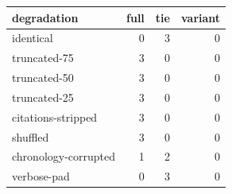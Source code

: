 \begin{tabular}{lrrr}
\toprule
degradation & full & tie & variant \\
\midrule
identical & 0 & 3 & 0 \\
truncated-75 & 3 & 0 & 0 \\
truncated-50 & 3 & 0 & 0 \\
truncated-25 & 3 & 0 & 0 \\
citations-stripped & 3 & 0 & 0 \\
shuffled & 3 & 0 & 0 \\
chronology-corrupted & 1 & 2 & 0 \\
verbose-pad & 0 & 3 & 0 \\
\bottomrule
\end{tabular}
